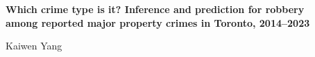 \documentclass[10pt,letterpaper]{article}
\begin{document}

\begin{center}
  {\sffamily\bfseries\Large Which crime type is it? Inference and prediction for robbery\\[1pt]
  among reported major property crimes in Toronto, 2014--2023\par}
  \vspace{3pt}
  {\sffamily Kaiwen Yang}
\end{center}
\vspace{-2pt}










\clearpage
{\footnotesize

}
\end{document}
